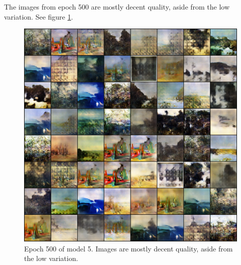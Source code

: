 \documentclass[11pt,letterpaper]{article}
\begin{document}
				The images from epoch 500 are mostly decent quality, aside from the low variation.
				See figure \ref{fig:wa128:epoch500generator}.
				\begin{figure}
					\centering
					\includegraphics[width=1.0\linewidth]{results/model5/epoch500_generator}
					\caption{Epoch 500 of model 5. Images are mostly decent quality, aside from the low variation.}
					\label{fig:wa128:epoch500generator}
				\end{figure}
\end{document}
